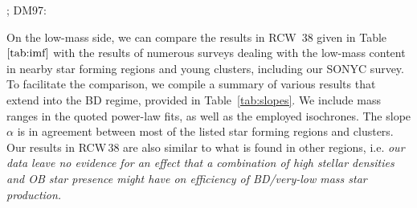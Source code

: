\documentclass[a4paper,fleqn,usenatbib]{mnras}
\begin{document}
\begin{table*}
\begin{tabular}{llccc}
\hline
\end{tabular}
; DM97: \citet{dantona97}\\
\end{table*}


On the low-mass side, we can compare the results in RCW~38 given in Table~$\ref{tab:imf}$ with the results of numerous
surveys dealing with the low-mass content in nearby star forming regions and young clusters, including our 
SONYC survey. To facilitate the comparison, we compile a summary of various results that extend into the BD regime, provided in Table~\ref{tab:slopes}.
We include mass ranges in the quoted power-law fits, as well as the employed isochrones. 
The slope $\alpha$ is in agreement between most of the listed star forming regions and clusters.
 Our results in RCW\,38 
are also similar to what is found in other regions, i.e. {\it our data leave no evidence for an effect that a combination of high stellar densities
and OB star presence might have on efficiency of BD/very-low mass star production.}
\end{document}
